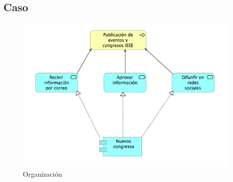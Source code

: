 \subsection{Caso}
\begin{figure}[th!]
	\centering
	\includegraphics[width=0.8\linewidth]{arquitectura_diseno/imgs/C_UsoAplicacion}
	\caption{Organización}
\end{figure}
